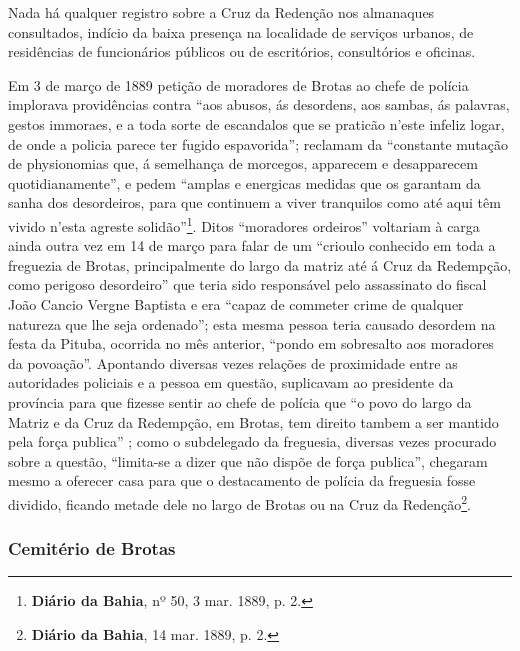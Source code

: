Nada há qualquer registro sobre a Cruz da Redenção nos almanaques consultados, indício da baixa presença na localidade de serviços urbanos, de residências de funcionários públicos ou de escritórios, consultórios e oficinas.

Em 3 de março de 1889 petição de moradores de Brotas ao chefe de polícia implorava providências contra ``aos abusos, ás desordens, aos sambas, ás palavras, gestos immoraes, e a toda sorte de escandalos que se praticão n'este infeliz logar, de onde a policia parece ter fugido espavorida''; reclamam da ``constante mutação de physionomias que, á semelhança de morcegos, apparecem e desapparecem quotidianamente'', e pedem ``amplas e energicas medidas que os garantam da sanha dos desordeiros, para que continuem a viver tranquilos como até aqui têm vivido n'esta agreste solidão''\footnote{\textbf{Diário da Bahia}, nº 50, 3 mar. 1889, p. 2.}. Ditos ``moradores ordeiros'' voltariam à carga ainda outra vez em 14 de março para falar de um ``crioulo conhecido em toda a freguezia de Brotas, principalmente do largo da matriz até á Cruz da Redempção, como perigoso desordeiro'' que teria sido responsável pelo assassinato do fiscal João Cancio Vergne Baptista e era ``capaz de commeter crime de qualquer natureza que lhe seja ordenado''; esta mesma pessoa teria causado desordem na festa da Pituba, ocorrida no mês anterior, ``pondo em sobresalto aos moradores da povoação''. Apontando diversas vezes relações de proximidade entre as autoridades policiais e a pessoa em questão, suplicavam ao presidente da província para que fizesse sentir ao chefe de polícia que ``o povo do largo da Matriz e da Cruz da Redempção, em Brotas, tem direito tambem a ser mantido pela força publica'' ; como o subdelegado da freguesia, diversas vezes procurado sobre a questão, ``limita-se a dizer que não dispõe de força publica'', chegaram mesmo a oferecer casa para que o destacamento de polícia da freguesia fosse dividido, ficando metade dele no largo de Brotas ou na Cruz da Redenção\footnote{\textbf{Diário da Bahia}, 14 mar. 1889, p. 2.}.

\subsubsection{Cemitério de Brotas}

